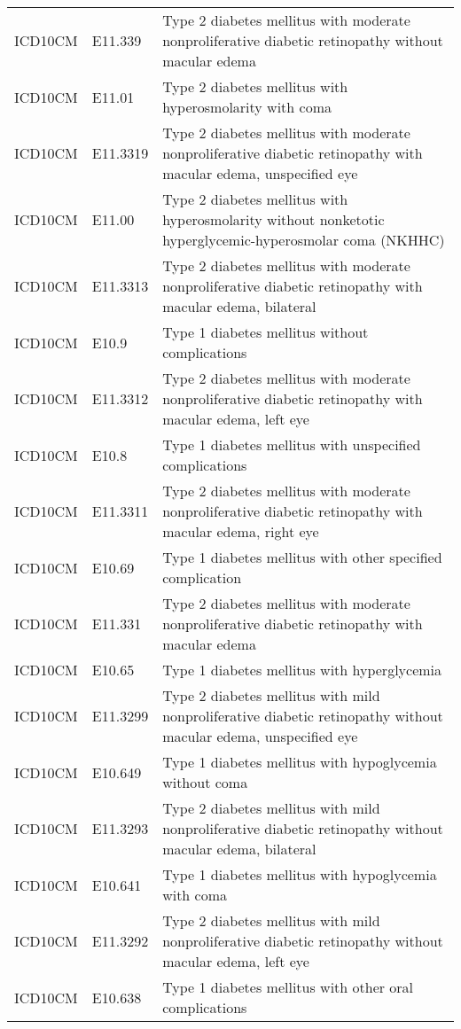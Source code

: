 \begin{table}[ht]
\begin{tabular}{lll}
  ICD10CM & E11.339 & Type 2 diabetes mellitus with moderate nonproliferative diabetic retinopathy without macular edema \\ 
  ICD10CM & E11.01 & Type 2 diabetes mellitus with hyperosmolarity with coma \\ 
  ICD10CM & E11.3319 & Type 2 diabetes mellitus with moderate nonproliferative diabetic retinopathy with macular edema, unspecified eye \\ 
  ICD10CM & E11.00 & Type 2 diabetes mellitus with hyperosmolarity without nonketotic hyperglycemic-hyperosmolar coma (NKHHC) \\ 
  ICD10CM & E11.3313 & Type 2 diabetes mellitus with moderate nonproliferative diabetic retinopathy with macular edema, bilateral \\ 
  ICD10CM & E10.9 & Type 1 diabetes mellitus without complications \\ 
  ICD10CM & E11.3312 & Type 2 diabetes mellitus with moderate nonproliferative diabetic retinopathy with macular edema, left eye \\ 
  ICD10CM & E10.8 & Type 1 diabetes mellitus with unspecified complications \\ 
  ICD10CM & E11.3311 & Type 2 diabetes mellitus with moderate nonproliferative diabetic retinopathy with macular edema, right eye \\ 
  ICD10CM & E10.69 & Type 1 diabetes mellitus with other specified complication \\ 
  ICD10CM & E11.331 & Type 2 diabetes mellitus with moderate nonproliferative diabetic retinopathy with macular edema \\ 
  ICD10CM & E10.65 & Type 1 diabetes mellitus with hyperglycemia \\ 
  ICD10CM & E11.3299 & Type 2 diabetes mellitus with mild nonproliferative diabetic retinopathy without macular edema, unspecified eye \\ 
  ICD10CM & E10.649 & Type 1 diabetes mellitus with hypoglycemia without coma \\ 
  ICD10CM & E11.3293 & Type 2 diabetes mellitus with mild nonproliferative diabetic retinopathy without macular edema, bilateral \\ 
  ICD10CM & E10.641 & Type 1 diabetes mellitus with hypoglycemia with coma \\ 
  ICD10CM & E11.3292 & Type 2 diabetes mellitus with mild nonproliferative diabetic retinopathy without macular edema, left eye \\ 
  ICD10CM & E10.638 & Type 1 diabetes mellitus with other oral complications \\ 

\end{tabular}
\end{table}
